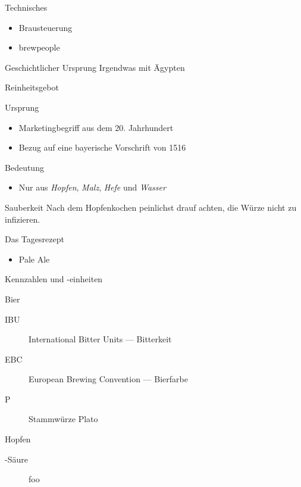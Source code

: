 \documentclass[18pt]{beamer}
\begin{document}
\begin{frame}{Technisches}
  \begin{itemize}
    \item Brausteuerung
    \item brewpeople
  \end{itemize}
\end{frame}
\begin{frame}{Geschichtlicher Ursprung}
  Irgendwas mit Ägypten
\end{frame}
\begin{frame}{Reinheitsgebot}
  \begin{block}{Ursprung}
    \begin{itemize}
      \item Marketingbegriff aus dem 20. Jahrhundert
      \item Bezug auf eine bayerische Vorschrift von 1516
    \end{itemize}
  \end{block}
  \begin{block}{Bedeutung}
    \begin{itemize}
      \item Nur aus \emph{Hopfen}, \emph{Malz}, \emph{Hefe} und \emph{Wasser}
    \end{itemize}
  \end{block}
\end{frame}
\begin{frame}{Sauberkeit}
  Nach dem Hopfenkochen peinlichst drauf achten, die Würze nicht zu infizieren.
\end{frame}
\begin{frame}{Das Tagesrezept}
  \begin{itemize}
    \item Pale Ale
  \end{itemize}
\end{frame}
\begin{frame}{Kennzahlen und -einheiten}
  \begin{block}{Bier}
    \begin{description}
      \item[IBU] International Bitter Units --- Bitterkeit
      \item[EBC] European Brewing Convention --- Bierfarbe
      \item[\textdegree P] Stammwürze \textdegree Plato
    \end{description}
  \end{block}

  \begin{block}{Hopfen}
    \begin{description}
      \item[\textalpha-Säure]  foo
    \end{description}
  \end{block}
\end{frame}
\end{document}
